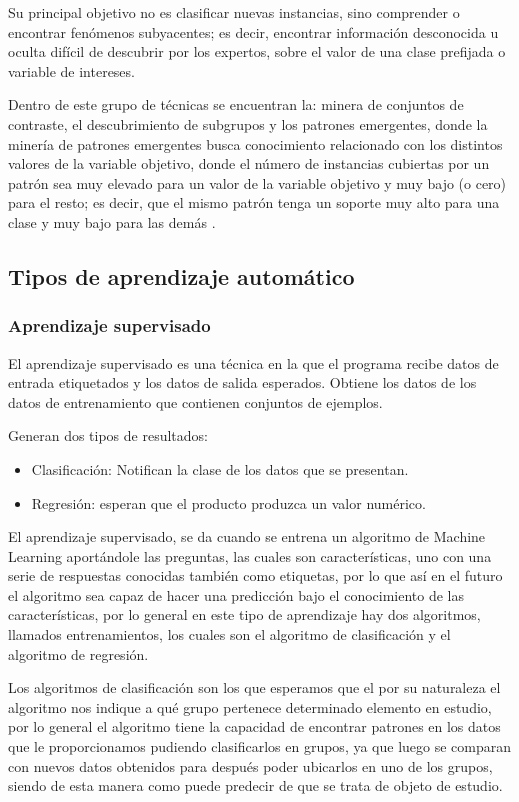 Su principal objetivo no es clasificar nuevas instancias, sino comprender o encontrar fenómenos subyacentes; es decir, encontrar información desconocida u oculta difícil de descubrir por los expertos, sobre el valor de una clase prefijada o variable de intereses.

Dentro de este grupo de técnicas se encuentran la: minera de conjuntos de contraste, el descubrimiento de subgrupos y los patrones emergentes, donde la minería de patrones emergentes busca conocimiento relacionado con los distintos valores de la variable objetivo, donde el número de instancias cubiertas por un patrón sea muy elevado para un valor de la variable objetivo y muy bajo (o cero) para el resto; es decir, que el mismo patrón tenga un soporte muy alto para una clase y muy bajo para las demás \cite{Carmona2015}.


\subsection{Tipos de aprendizaje automático}

\subsubsection{Aprendizaje supervisado}

El aprendizaje supervisado es una técnica en la que el programa recibe datos de entrada etiquetados y los datos de salida esperados. Obtiene los datos de los datos de entrenamiento que contienen conjuntos de ejemplos. 

Generan dos tipos de resultados:
\begin{itemize}
\item Clasificación: Notifican la clase de los datos que se presentan.
\item Regresión: esperan que el producto produzca un valor numérico.
\end{itemize}

El aprendizaje supervisado, se da cuando se entrena un algoritmo de Machine Learning aportándole las preguntas, las cuales son características, uno con una serie de respuestas conocidas también como etiquetas, por lo que así en el futuro el algoritmo sea capaz de hacer una predicción bajo el conocimiento de las características, por lo general en este tipo de aprendizaje hay dos algoritmos, llamados entrenamientos, los cuales son el algoritmo de clasificación y el algoritmo de regresión.

Los algoritmos de clasificación son los que esperamos que el por su naturaleza el algoritmo nos indique a qué grupo pertenece determinado elemento en estudio, por lo general el algoritmo tiene la capacidad de encontrar patrones en los datos que le proporcionamos pudiendo clasificarlos en grupos, ya que luego se comparan con nuevos datos obtenidos para después poder ubicarlos en uno de los grupos, siendo de esta manera como puede predecir de que se trata de objeto de estudio. 
 
